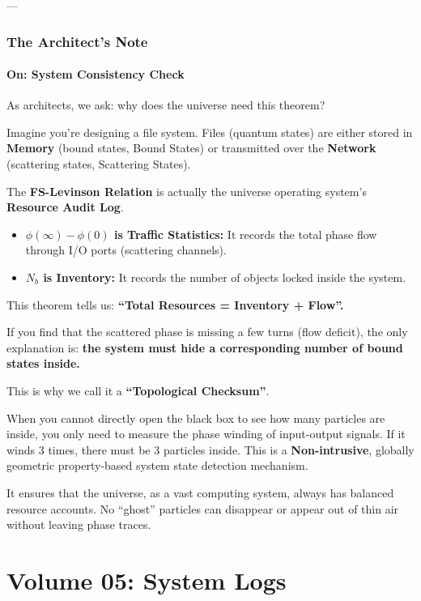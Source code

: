 \documentclass[11pt,a4paper,twoside]{book}
\begin{document}
---

\section{The Architect's Note}

\subsection{On: System Consistency Check}

As architects, we ask: why does the universe need this theorem?

Imagine you're designing a file system. Files (quantum states) are either stored in \textbf{Memory} (bound states, Bound States) or transmitted over the \textbf{Network} (scattering states, Scattering States).

The \textbf{FS-Levinson Relation} is actually the universe operating system's \textbf{Resource Audit Log}.

\begin{itemize}
\item \textbf{$\phi(\infty) - \phi(0)$ is Traffic Statistics:} It records the total phase flow through I/O ports (scattering channels).

\item \textbf{$N_b$ is Inventory:} It records the number of objects locked inside the system.
\end{itemize}

This theorem tells us: \textbf{``Total Resources = Inventory + Flow''.}

If you find that the scattered phase is missing a few turns (flow deficit), the only explanation is: \textbf{the system must hide a corresponding number of bound states inside.}

This is why we call it a \textbf{``Topological Checksum''}.

When you cannot directly open the black box to see how many particles are inside, you only need to measure the phase winding of input-output signals. If it winds 3 times, there must be 3 particles inside. This is a \textbf{Non-intrusive}, globally geometric property-based system state detection mechanism.

It ensures that the universe, as a vast computing system, always has balanced resource accounts. No ``ghost'' particles can disappear or appear out of thin air without leaving phase traces.

 
\part{Volume 05: System Logs}
\end{document}
